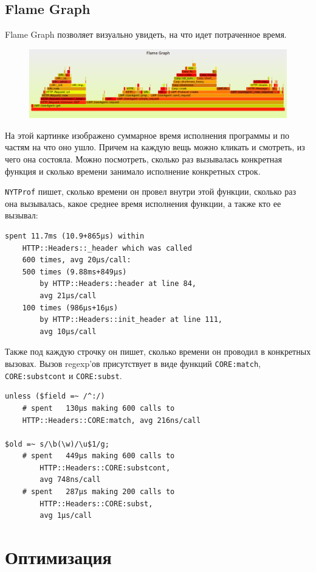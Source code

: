 \subsection{Flame Graph}
Flame Graph позволяет визуально увидеть, на что идет потраченное время.
\begin{figure}[H] %
	\centering
	\includegraphics[width=15cm]{lectures/L12/flame.png}
\end{figure}
На этой картинке изображено суммарное время исполнения программы и по частям на что оно ушло. Причем на каждую вещь можно кликать и смотреть, из чего она состояла. Можно посмотреть, сколько раз вызывалась конкретная функция и сколько времени занимало исполнение конкретных строк.
\begin{figure}[H]
\end{figure}
\verb|NYTProf| пишет, сколько времени он провел внутри этой функции, сколько раз она вызывалась, какое среднее время исполнения функции, а также кто ее вызывал:
\begin{verbatim}
spent 11.7ms (10.9+865µs) within
    HTTP::Headers::_header which was called
    600 times, avg 20µs/call:
    500 times (9.88ms+849µs)
        by HTTP::Headers::header at line 84,
        avg 21µs/call
    100 times (986µs+16µs)
        by HTTP::Headers::init_header at line 111,
        avg 10µs/call
\end{verbatim}
Также под каждую строчку он пишет, сколько времени он проводил в конкретных вызовах. Вызов regexp'ов присутствует в виде функций \verb|CORE:match|, \verb|CORE:substcont| и \verb|CORE:subst|.
\begin{verbatim}
unless ($field =~ /^:/)
    # spent   130µs making 600 calls to
    HTTP::Headers::CORE:match, avg 216ns/call

$old =~ s/\b(\w)/\u$1/g;
    # spent   449µs making 600 calls to
        HTTP::Headers::CORE:substcont,
        avg 748ns/call
    # spent   287µs making 200 calls to
        HTTP::Headers::CORE:subst,
        avg 1µs/call
\end{verbatim}


\section{Оптимизация}
